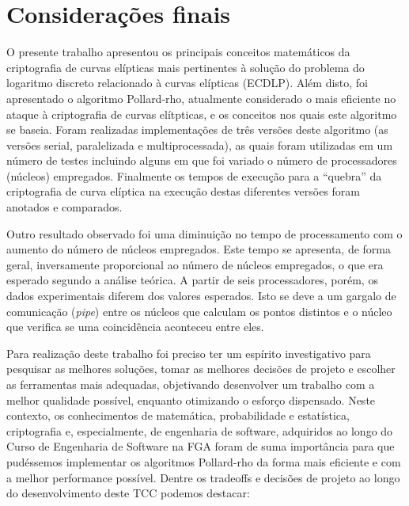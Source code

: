 \chapter{Considerações finais}
O presente trabalho apresentou os principais conceitos matemáticos da criptografia de curvas elípticas mais pertinentes à solução do problema do logaritmo discreto relacionado à curvas elípticas (ECDLP). Além disto, foi apresentado o algoritmo Pollard-rho, atualmente considerado o mais eficiente no ataque à criptografia de curvas elítpticas, e os conceitos nos quais este algoritmo se baseia. Foram realizadas implementações de três versões deste algoritmo (as versões serial, paralelizada e multiprocessada), as quais foram utilizadas em um número de testes incluindo alguns em que foi variado o número de processadores (núcleos) empregados. Finalmente os tempos de execução para a ``quebra'' da criptografia de curva elíptica na execução destas diferentes versões foram anotados e comparados.


Outro resultado observado foi uma diminuição no tempo de processamento com o aumento do número de 
núcleos empregados. Este tempo se apresenta, de forma geral, inversamente proporcional ao número de 
núcleos empregados, o que era esperado segundo a análise teórica. A partir de seis processadores, porém, 
os dados experimentais diferem dos valores esperados. Isto se deve a um gargalo de comunicação (\textit{pipe})
entre os núcleos que calculam os pontos distintos e o núcleo que verifica se uma coincidência aconteceu 
entre eles.

Para realização deste trabalho foi preciso ter um espírito investigativo para pesquisar as melhores soluções, tomar as melhores decisões de projeto e escolher as ferramentas mais adequadas, objetivando desenvolver um trabalho com a melhor qualidade possível, enquanto otimizando o esforço dispensado. Neste contexto, os conhecimentos de matemática, probabilidade e estatística, criptografia e, especialmente, de engenharia de software, adquiridos ao longo do Curso de Engenharia de Software na FGA foram de suma importância para que pudéssemos implementar os algoritmos Pollard-rho da forma mais eficiente e com a melhor performance possível. Dentre os tradeoffs e decisões de projeto ao longo do desenvolvimento deste TCC podemos destacar:

